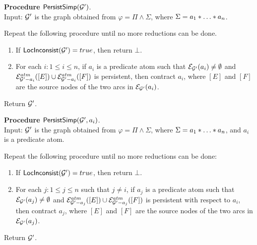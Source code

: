 \documentclass{llncs}
\begin{document}
\medskip

\noindent
{\bf Procedure ${\sf PersistSimp}(\mathcal{G}')$}.\\
Input: $\mathcal{G}'$ is the graph obtained from $\varphi = \Pi \wedge \Sigma$, where $\Sigma=a_1 \sep \dots \sep a_n$.

\noindent Repeat the following procedure until no more reductions can be done.
\begin{enumerate}
\item If ${\sf LocInconsist}(\mathcal{G}') = true$, then return $\bot$.

\item For each $i: 1 \le i \le n$, if $a_i$ is a predicate atom such that $\mathcal{E}_{\mathcal{G}'}(a_i) \neq \emptyset$ and $\mathcal{E}^{atm}_{\mathcal{G}'-a_i}([E]) \cup \mathcal{E}^{atm}_{\mathcal{G}'-a_i}([F])$ is persistent, then contract $a_i$, where  $[E]$ and $[F]$ are the source nodes of the two arcs in $\mathcal{E}_{\mathcal{G}'}(a_i)$.
\end{enumerate}
Return $\mathcal{G}'$.
\medskip

\noindent
{\bf Procedure ${\sf PersistSimp}(\mathcal{G}',a_i)$}.\\
Input: $\mathcal{G}'$ is the graph obtained from $\varphi = \Pi \wedge \Sigma$, where $\Sigma=a_1 \sep \dots \sep a_n$, and $a_i$ is a predicate atom.

\noindent Repeat the following procedure until no more reductions can be done: 
\begin{enumerate}
\item If ${\sf LocInconsist}(\mathcal{G}') = true$, then return $\bot$.

\item For each $j: 1 \le j \le n$ such that $j \neq i$, if $a_j$ is a predicate atom such that $\mathcal{E}_{\mathcal{G}'}(a_j) \neq \emptyset$  and $\mathcal{E}^{atm}_{\mathcal{G}'-a_j}([E]) \cup \mathcal{E}^{atm}_{\mathcal{G}'-a_j}([F])$ is persistent with respect to $a_i$, then contract $a_j$, where  $[E]$ and $[F]$ are the source nodes of the two arcs in $\mathcal{E}_{\mathcal{G}'}(a_j)$.
\end{enumerate}
Return $\mathcal{G}'$.
\end{document}
